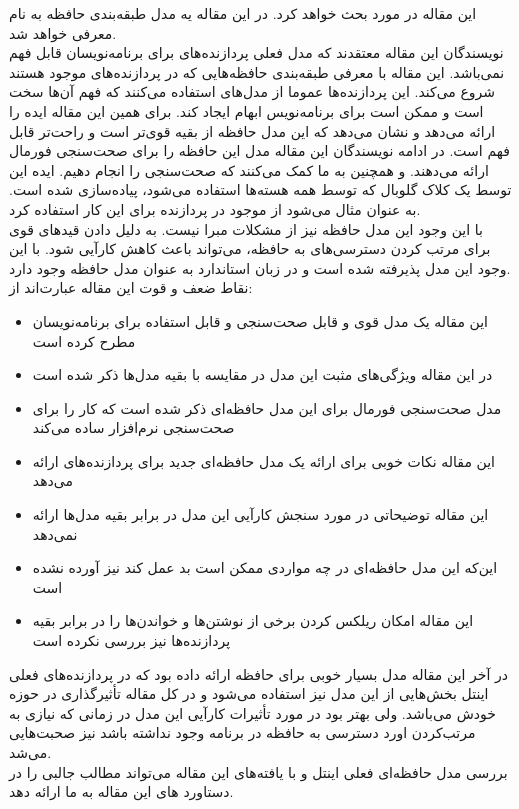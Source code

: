 \documentclass[a4paper, 12pt]{article}
\title{\lr{x86-TSO: A Rigorous and Usable Programmer’s Model for
x86 Multiprocessors}}
\author{حسین افکار}
\begin{document}
\maketitle
این مقاله در مورد
بحث خواهد کرد.
در این مقاله یه مدل طبقه‌بندی حافظه به نام
معرفی خواهد شد. \\
نویسندگان این مقاله معتقدند که مدل فعلی پردازنده‌های
برای برنامه‌نویسان قابل فهم نمی‌باشد.
این مقاله با معرفی طبقه‌بندی حافظه‌هایی که در پردازنده‌های
موجود هستند شروع می‌کند. این پردازنده‌ها عموما از مدل‌های
استفاده می‌کنند که فهم آن‌ها سخت است و ممکن است برای برنامه‌نویس ابهام ایجاد کند.
برای همین این مقاله ایده
را ارائه می‌دهد و نشان می‌دهد که این مدل حافظه از بقیه قوی‌تر است و راحت‌تر قابل فهم است.
در ادامه نویسندگان این مقاله مدل این حافظه را برای صحت‌سنجی فورمال ارائه می‌دهند.
و همچنین به ما کمک می‌کنند که صحت‌سنجی را انجام دهیم.
ایده این
توسط یک کلاک گلوبال که توسط همه هسته‌ها استفاده می‌شود، پیاده‌سازی شده است.
به عنوان مثال می‌شود از
موجود در پردازنده برای این کار استفاده کرد. \\
با این وجود این مدل حافظه نیز از مشکلات مبرا نیست. به دلیل دادن قید‌های قوی برای
مرتب کردن دسترسی‌های به حافظه، می‌تواند باعث کاهش کارآیی شود.
با این وجود این مدل پذیرفته شده است و در زبان
استاندارد به عنوان مدل حافظه وجود دارد. \\
نقاط ضعف و قوت این مقاله عبارت‌اند از:
\begin{itemize}
    \item این مقاله یک مدل قوی و قابل صحت‌سنجی و قابل‌ استفاده برای برنامه‌نویسان مطرح کرده است
    \item در این مقاله ویژگی‌های مثبت این مدل در مقایسه با بقیه مدل‌ها ذکر شده است
    \item مدل صحت‌سنجی فورمال برای این مدل حافظه‌ای ذکر شده است که کار را برای صحت‌سنجی نرم‌افزار ساده می‌کند
    \item این مقاله نکات خوبی برای ارائه یک مدل حافظه‌ای جدید برای پردازنده‌های 
    ارائه می‌دهد
    \item این مقاله توضیحاتی در مورد سنجش کارآیی این مدل در برابر بقیه مدل‌ها ارائه نمی‌دهد
    \item این‌که این مدل حافظه‌ای در چه مواردی ممکن است بد عمل کند نیز آورده نشده است
    \item این مقاله امکان ریلکس کردن برخی از نوشتن‌ها و خواندن‌ها را در برابر بقیه پردازنده‌ها نیز بررسی نکرده است
\end{itemize}
در آخر این مقاله مدل بسیار خوبی برای حافظه ارائه داده بود که در پردازنده‌های فعلی اینتل بخش‌هایی از این مدل نیز
استفاده می‌شود و در کل مقاله تأثیرگذاری در حوزه خودش می‌باشد.
ولی بهتر بود در مورد تأثیرات کارآیی این مدل در زمانی که نیازی به مرتب‌کردن اورد دسترسی به حافظه در برنامه وجود نداشته باشد
نیز صحبت‌هایی می‌شد. \\
بررسی مدل حافظه‌ای فعلی اینتل و
با یافته‌های این مقاله می‌تواند مطالب جالبی را در دستاورد های این مقاله به ما ارائه دهد.
\end{document}
